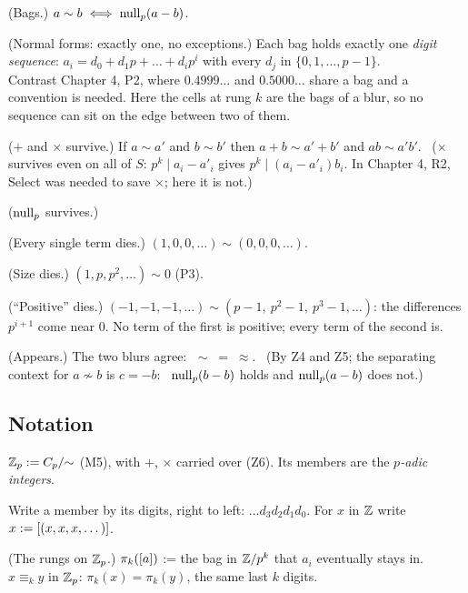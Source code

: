 \begin{lines}
\item[\lab{P5}] (Bags.) $a \sim b \iff \operatorname{null}_p(a - b)$.
\item[\lab{P6}] (Normal forms: exactly one, no exceptions.) Each bag holds exactly one \emph{digit sequence}: $a_i = d_0 + d_1 p + \dots + d_i p^i$ with every $d_j$ in $\{0, 1, \dots, p - 1\}$. \\
Contrast Chapter 4, P2, where $0.4999\dots$ and $0.5000\dots$ share a bag and a convention is needed. Here the cells at rung $k$ are the bags of a blur, so no sequence can sit on the edge between two of them.
\item[\lab{P7.1}] ($+$ and $\times$ survive.) If $a \sim a'$ and $b \sim b'$ then $a + b \sim a' + b'$ and $a b \sim a' b'$. \ ($\times$ survives even on all of $S$: $p^k \mid a_i - a'_i$ gives $p^k \mid (a_i - a'_i) b_i$. In Chapter 4, R2, Select was needed to save $\times$; here it is not.)
\item[\lab{P7.2}] ($\operatorname{null}_p$ survives.)
\item[\lab{P8.1}] (Every single term dies.) $(1, 0, 0, \dots) \sim (0, 0, 0, \dots)$.
\item[\lab{P8.2}] (Size dies.) $(1, p, p^2, \dots) \sim 0$ (P3).
\item[\lab{P8.3}] (``Positive'' dies.) $(-1, -1, -1, \dots) \sim (p - 1,\ p^2 - 1,\ p^3 - 1, \dots)$: the differences $p^{i+1}$ come near $0$. No term of the first is positive; every term of the second is.
\item[\lab{P9}] (Appears.) The two blurs agree: $\;\sim \;=\; \approx$. \ (By Z4 and Z5; the separating context for $a \not\sim b$ is $c = -b$: \ $\operatorname{null}_p(b - b)$ holds and $\operatorname{null}_p(a - b)$ does not.)
\end{lines}

\subsection*{Notation}

\begin{lines}
\item[\lab{N1}] $\mathbb{Z}_p := C_p/{\sim}$ (M5), with $+$, $\times$ carried over (Z6). Its members are the \emph{$p$-adic integers}.
\item[\lab{N2}] Write a member by its digits, right to left: $\dots d_3 d_2 d_1 d_0$. For $x$ in $\mathbb{Z}$ write $x := [(x, x, x, \dots)]$.
\item[\lab{N3}] (The rungs on $\mathbb{Z}_p$.) $\pi_k([a])$ := the bag in $\mathbb{Z}/p^k$ that $a_i$ eventually stays in. \ $x \equiv_k y$ in $\mathbb{Z}_p$: $\pi_k(x) = \pi_k(y)$, the same last $k$ digits.
\end{lines}

